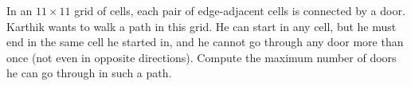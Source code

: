 In an $11 \times 11$ grid of cells, each pair of edge-adjacent cells is connected by a door. Karthik wants to walk a path in this grid. He can start in any cell, but he must end in the same cell he started in, and he cannot go through any door more than once (not even in opposite directions). Compute the maximum number of doors he can go through in such a path.